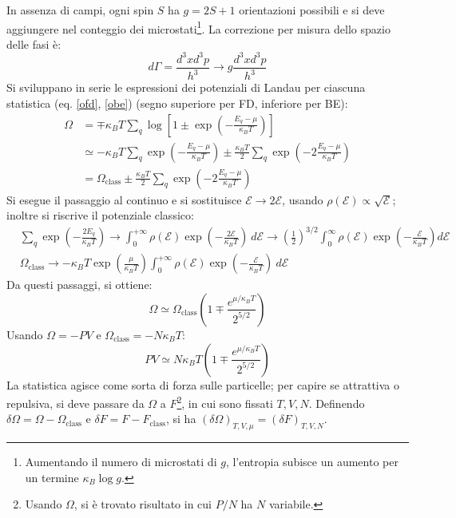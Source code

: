 \documentclass[10pt, a4paper]{scrartcl}
\numberwithin{equation}{subsection}
\theoremstyle{style1}
\theoremstyle{style2}
\begin{document}
In assenza di campi, ogni spin $S$ ha $g = 2S + 1$ orientazioni possibili e si deve aggiungere nel conteggio dei microstati\footnote{Aumentando il numero di microstati di $g$, l'entropia subisce un aumento per un termine $\kappa _B \log g$.}. La correzione per misura dello spazio delle fasi \`e:
\[
d\Gamma= \frac{d^3 x d^3 p }{h^3}\to g \frac{d^3 xd^3p}{h^3}
\] 
Si sviluppano in serie le espressioni dei potenziali di Landau per ciascuna statistica (eq. \ref{ofd}, \ref{obe}) (segno superiore per FD, inferiore per BE):
\begin{equation*}
	\begin{split}
		\Omega &= \mp \kappa _B T \sum_{q}^{} \log \left[ 1\pm \exp\left( - \frac{E_q - \mu }{\kappa _B T}\right)  \right] \\
		       &\simeq -\kappa _B T \sum_{q}^{} \exp \left(-\frac{E_q - \mu }{\kappa _B T} \right) \pm \frac{\kappa _B T }{2}\sum_{q}^{} \exp \left(-2 \frac{E_q - \mu }{\kappa_B T }\right) \\
		       &= \Omega _\text{class} \pm \frac{\kappa _B T}{2} \sum_{q}^{} \exp \left( - 2 \frac{E_q - \mu }{\kappa _B T}\right) 
	\end{split}
\end{equation*}
Si esegue il passaggio al continuo e si sostituisce $\mathscr{E} \to 2\mathscr{E}$, usando $\rho (\mathscr{E}) \propto \sqrt{\mathscr{E}} $; inoltre si riscrive il potenziale classico:
\[
\begin{split}
	&\sum_{q}^{} \exp \left(- \frac{2 E_q}{\kappa _B T}\right)  \to \int_{0} ^{+\infty} \rho (\mathscr{E}) \exp \left(-\frac{2\mathscr{E}}{\kappa _B T}\right) \ d\mathscr{E} \to \left(\frac{1}{2}\right) ^{3 / 2} \int_{0} ^{\infty} \rho (\mathscr{E}) \exp\left(- \frac{\mathscr{E}}{\kappa _B T}\right)  d \mathscr{E}\\
	& \Omega _\text{class} \to - \kappa _B T \exp \left(\frac{\mu  }{\kappa _B T}\right)  \int_{0} ^{+\infty} \rho (\mathscr{E}) \exp \left(- \frac{\mathscr{E}}{\kappa _B T}\right) \ d \mathscr{E}
\end{split}
\] 
Da questi passaggi, si ottiene:
\begin{equation}
	\Omega \simeq \Omega _{\text{class}} \left(1 \mp \frac{e^{ \mu  / \kappa _B  T} }{2 ^{5 / 2} }\right) 
\end{equation}
Usando $\Omega  = - PV $ e $\Omega _\text{class} = - N \kappa _B T$:
\begin{equation}
	PV \simeq N\kappa _B T \left(1 \mp \frac{e^{ \mu  / \kappa _B T} }{2^{ 5 / 2} }\right) 
\end{equation}
La statistica agisce come sorta di forza sulle particelle; per capire se attrattiva o repulsiva, si deve passare da $\Omega $ a $F $\footnote{Usando $\Omega $, si \`e trovato risultato in cui $P / N$ ha $N$ variabile.}, in cui sono fissati $T,V,N$. Definendo $\delta \Omega = \Omega  - \Omega _\text{class}$ e $\delta F  = F - F_\text{class}$, si ha $(\delta \Omega ) _{T,V,\mu } = (\delta F) _{T,V,N} $. 
\end{document}
